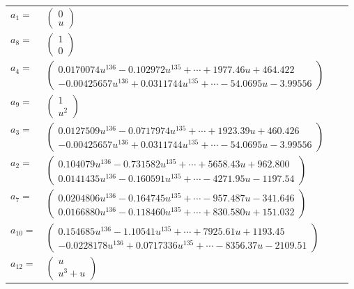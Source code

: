 \documentclass[1p]{elsarticle_modified}
\theoremstyle{definition}
\begin{document}
\begin{tabular}{m{7pt} m{180pt} m{7pt} m{180pt} }
\flushright $a_{1}=$&$\begin{pmatrix}0\\u\end{pmatrix}$ \\
\flushright $a_{8}=$&$\begin{pmatrix}1\\0\end{pmatrix}$ \\
\flushright $a_{4}=$&$\begin{pmatrix}0.0170074 u^{136}-0.102972 u^{135}+\cdots+1977.46 u+464.422\\-0.00425657 u^{136}+0.0311744 u^{135}+\cdots-54.0695 u-3.99556\end{pmatrix}$ \\
\flushright $a_{9}=$&$\begin{pmatrix}1\\u^2\end{pmatrix}$ \\
\flushright $a_{3}=$&$\begin{pmatrix}0.0127509 u^{136}-0.0717974 u^{135}+\cdots+1923.39 u+460.426\\-0.00425657 u^{136}+0.0311744 u^{135}+\cdots-54.0695 u-3.99556\end{pmatrix}$ \\
\flushright $a_{2}=$&$\begin{pmatrix}0.104079 u^{136}-0.731582 u^{135}+\cdots+5658.43 u+962.800\\0.0141435 u^{136}-0.160591 u^{135}+\cdots-4271.95 u-1197.54\end{pmatrix}$ \\
\flushright $a_{7}=$&$\begin{pmatrix}0.0204806 u^{136}-0.164745 u^{135}+\cdots-957.487 u-341.646\\0.0166880 u^{136}-0.118460 u^{135}+\cdots+830.580 u+151.032\end{pmatrix}$ \\
\flushright $a_{10}=$&$\begin{pmatrix}0.154685 u^{136}-1.10541 u^{135}+\cdots+7925.61 u+1193.45\\-0.0228178 u^{136}+0.0717336 u^{135}+\cdots-8356.37 u-2109.51\end{pmatrix}$ \\
\flushright $a_{12}=$&$\begin{pmatrix}u\\u^3+u\end{pmatrix}$ \\

\end{tabular}
\end{document}
